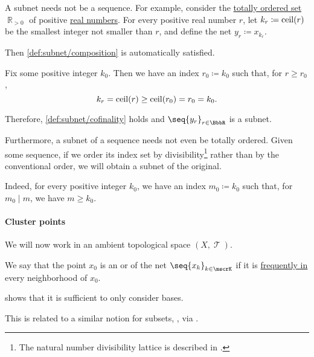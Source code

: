 \begin{example}
\begin{thmenum}
    A subnet needs not be a sequence. For example, consider the \hyperref[def:totally_ordered_set]{totally ordered set} \( \BbbR_{>0} \) of positive \hyperref[def:real_numbers]{real numbers}. For every positive real number \( r \), let \( k_r \coloneqq \operatorname{ceil}(r) \) be the smallest integer not smaller than \( r \), and define the net \( y_r \coloneqq x_{k_r} \).

    Then \ref{def:subnet/composition} is automatically satisfied.

    Fix some positive integer \( k_0 \). Then we have an index \( r_0 \coloneqq k_0 \) such that, for \( r \geq r_0 \),
    \begin{equation*}
      k_r = \operatorname{ceil}(r) \geq \operatorname{ceil}(r_0) = r_0 = k_0.
    \end{equation*}

    Therefore, \ref{def:subnet/cofinality} holds and \( \seq{ y_r }_{r \in \BbbR} \) is a subnet.

     Furthermore, a subnet of a sequence needs not even be totally ordered. Given some sequence, if we order its index set by divisibility\footnote{The natural number divisibility lattice is described in .} rather than by the conventional order, we will obtain a subnet of the original.

    Indeed, for every positive integer \( k_0 \), we have an index \( m_0 \coloneqq k_0 \) such that, for \( m_0 \mid m \), we have \( m \geq k_0 \).
  \end{thmenum}
\end{example}

\paragraph{Cluster points}

We will now work in an ambient topological space \( (X, \mscrT) \).

\begin{definition}\label{def:net_cluster_point}
  We say that the point \( x_0 \) is an  or  of the net \( \seq{ x_k }_{k \in \mscrK} \) if it is \hyperref[def:net_frequently_in]{frequently in} every neighborhood of \( x_0 \).
\end{definition}
\begin{comments}
  \item {} shows that it is sufficient to only consider bases.
  \item This is related to a similar notion for subsets, , via .
\end{comments}

